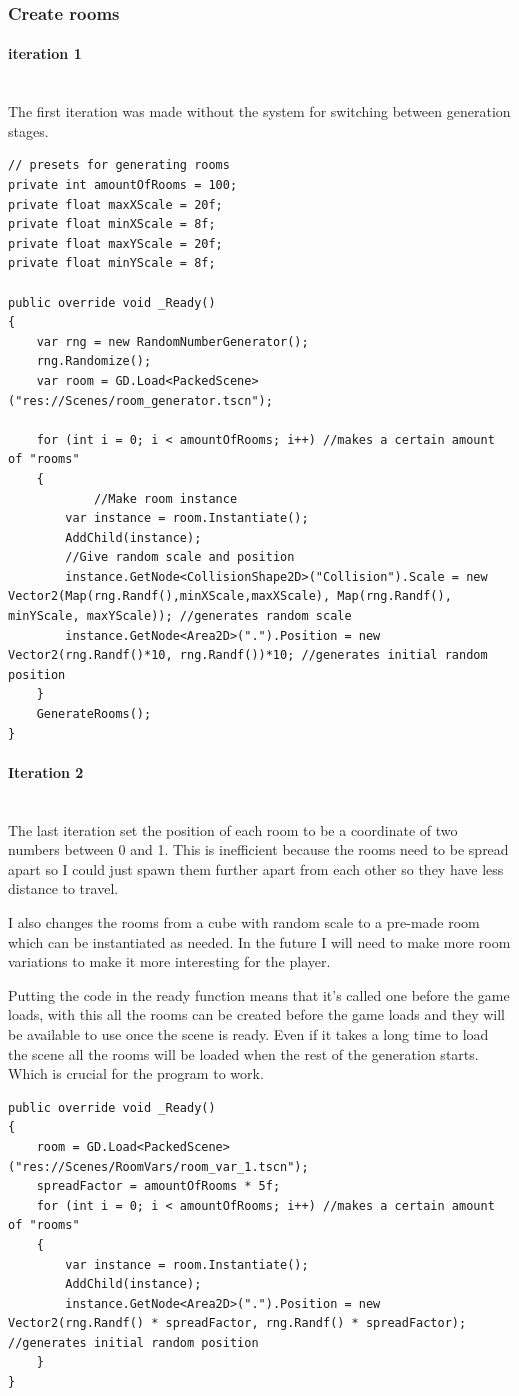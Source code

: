 \documentclass{article}
\newcommand{\parBr}{\vspace{5mm}}%
\newcommand{\myparagraph}[1]{\paragraph{#1}\mbox{}\\} %
\begin{document}
\subsubsection{Create rooms}
\myparagraph{iteration 1}
The first iteration was made without the system for switching between generation stages.
\begin{lstlisting}
// presets for generating rooms
private int amountOfRooms = 100;
private float maxXScale = 20f;
private float minXScale = 8f;
private float maxYScale = 20f;
private float minYScale = 8f;

public override void _Ready()
{
    var rng = new RandomNumberGenerator();
    rng.Randomize();
    var room = GD.Load<PackedScene>("res://Scenes/room_generator.tscn");

    for (int i = 0; i < amountOfRooms; i++) //makes a certain amount of "rooms"
    {
    	    //Make room instance
        var instance = room.Instantiate();
        AddChild(instance);
        //Give random scale and position
        instance.GetNode<CollisionShape2D>("Collision").Scale = new Vector2(Map(rng.Randf(),minXScale,maxXScale), Map(rng.Randf(), minYScale, maxYScale)); //generates random scale
        instance.GetNode<Area2D>(".").Position = new Vector2(rng.Randf()*10, rng.Randf())*10; //generates initial random position
    }
    GenerateRooms();
}
\end{lstlisting}

\myparagraph{Iteration 2}
The last iteration set the position of each room to be a coordinate of two numbers between 0 and 1. This is inefficient because the rooms need to be spread apart so I could just spawn them further apart from each other so they have less distance to travel.

\parBr

I also changes the rooms from a cube with random scale to a pre-made room which can be instantiated as needed. In the future I will need to make more room variations to make it more interesting for the player. 

\parBr

Putting the code in the ready function means that it's called one before the game loads, with this all the rooms can be created before the game loads and they will be available to use once the scene is ready. Even if it takes a long time to load the scene all the rooms will be loaded when the rest of the generation starts. Which is crucial for the program to work.
\begin{lstlisting}
public override void _Ready()
{
	room = GD.Load<PackedScene>("res://Scenes/RoomVars/room_var_1.tscn");
	spreadFactor = amountOfRooms * 5f;
	for (int i = 0; i < amountOfRooms; i++) //makes a certain amount of "rooms"
	{
    	var instance = room.Instantiate();
    	AddChild(instance);
    	instance.GetNode<Area2D>(".").Position = new Vector2(rng.Randf() * spreadFactor, rng.Randf() * spreadFactor); //generates initial random position
	}
}
\end{lstlisting}
\end{document}
